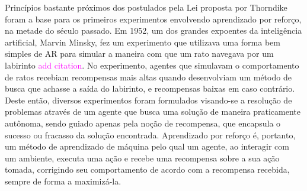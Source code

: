 \documentclass[cic,tc]{iiufrgs}
\newcommand\bruno[1]{\textcolor{magenta}{#1}}
\begin{document}
Princípios bastante próximos dos postulados pela Lei proposta por Thorndike foram a base para os primeiros experimentos
envolvendo aprendizado por reforço, na metade do século passado. Em 1952, um dos grandes expoentes da inteligência artificial,
Marvin Minsky, fez um experimento que utilizava uma forma bem simples de AR para simular a maneira com que um rato
%
%
navegava por um labirinto \bruno{add citation}. No experimento, agentes que simulavam o comportamento de ratos recebiam recompensas mais altas quando desenvolviam um
método de busca que achasse a saída do labirinto, e recompensas baixas em caso contrário.
Deste então, diversos experimentos foram formulados visando-se a resolução de problemas através de um agente que busca uma solução
de maneira praticamente autônoma, sendo guiado apenas pela noção de recompensa, que encapsula o sucesso ou fracasso da solução encontrada.
Aprendizado por reforço é, portanto, um método de aprendizado de máquina pelo qual um agente, ao interagir com um ambiente,
executa uma ação e recebe uma recompensa sobre a sua ação tomada, corrigindo seu comportamento de acordo com a recompensa recebida,
sempre de forma a maximizá-la.
\end{document}
